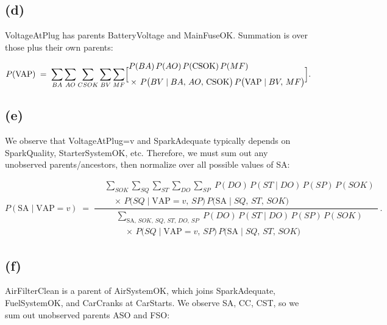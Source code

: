 \documentclass[11pt]{article}
\begin{document}
\subsection*{(d)}

VoltageAtPlug has parents BatteryVoltage and MainFuseOK. Summation is over those plus their own parents:

\[
P(\mathrm{VAP})
\;=\;
\sum_{BA}\sum_{AO}\sum_{CSOK}\sum_{BV}\sum_{MF}
\Bigl[
\begin{aligned}
  &P(BA)\,P(AO)\,P(\mathrm{CSOK})\,P(MF)\,\\[1mm]
  &\times \,P\bigl(BV \mid BA,\,AO,\,\mathrm{CSOK}\bigr)\,P\bigl(\mathrm{VAP}\mid BV,\,MF\bigr)
\end{aligned}
\Bigr].
\]

\subsection*{(e)}

We observe that VoltageAtPlug=v and SparkAdequate typically depends on SparkQuality, StarterSystemOK, etc.
Therefore, we must sum out any unobserved parents/ancestors, then normalize over all possible values of SA:

\[
P(\mathrm{SA}\mid \mathrm{VAP}=v)
\;=\;
\frac{
\begin{aligned}
  &\sum_{SOK}\!\sum_{SQ}\!\sum_{ST}\!\sum_{DO}\!\sum_{SP} \; 
    P(DO)\,P(ST \mid DO)\,P(SP)\,P(SOK)\\[1mm]
  &\quad \times \,
    P\bigl(SQ\mid \mathrm{VAP}=v,\,SP\bigr)\,P\bigl(\mathrm{SA}\mid SQ,\,ST,\,SOK\bigr)
\end{aligned}
}{
\begin{aligned}
  &\sum_{\mathrm{SA},\,SOK,\,SQ,\,ST,\,DO,\,SP} \; 
    P(DO)\,P(ST \mid DO)\,P(SP)\,P(SOK)\\[1mm]
  &\quad \times \,
    P\bigl(SQ\mid \mathrm{VAP}=v,\,SP\bigr)\,P\bigl(\mathrm{SA}\mid SQ,\,ST,\,SOK\bigr)
\end{aligned}
}\,.
\]

\subsection*{(f)}

AirFilterClean is a parent of AirSystemOK, which joins SparkAdequate, FuelSystemOK, and CarCranks at CarStarts. 
We observe SA, CC, CST, so we sum out unobserved parents ASO and FSO:
\end{document}

